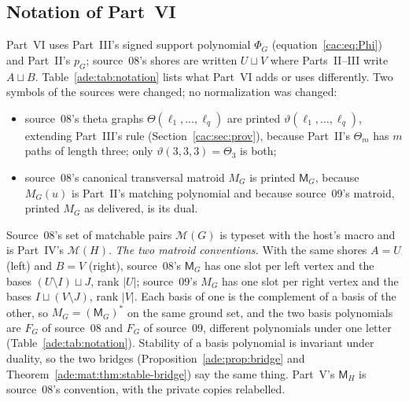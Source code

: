 \documentclass[11pt]{article}
\numberwithin{equation}{section}
\theoremstyle{definition}
\begin{document}
\subsection{Notation of Part~VI}
\label{ade:sec:notation}
Part~VI uses Part~III's signed support polynomial $\Phi_G$
(equation~\eqref{cac:eq:Phi}) and Part~II's $p_G$; source~08's shores are
written $U\sqcup V$ where Parts~II--III write $A\sqcup B$.
Table~\ref{ade:tab:notation} lists what Part~VI adds or uses differently.
Two symbols of the sources were changed; no normalization was changed:
\begin{itemize}[leftmargin=1.4em]
\item source~08's theta graphs $\Theta(\ell_1,\ldots,\ell_q)$ are printed
$\vartheta(\ell_1,\ldots,\ell_q)$, extending Part~III's rule
(Section~\ref{cac:sec:prov}), because Part~II's $\Theta_m$ has $m$ paths of
length three; only $\vartheta(3,3,3)=\Theta_3$ is both;
\item source~08's canonical transversal matroid $M_G$ is printed
$\mathsf M_G$, because $M_G(u)$ is Part~II's matching polynomial and because
source~09's matroid, printed $M_G$ as delivered, is its dual.
\end{itemize}
Source~08's set of matchable pairs $\mathcal M(G)$ is typeset with the
host's macro and is Part~IV's $\mathcal M(H)$.
\emph{The two matroid conventions.} With the same shores $A=U$ (left) and
$B=V$ (right), source~08's $\mathsf M_G$ has one slot per left vertex and the
bases $(U\setminus I)\sqcup J$, rank $|U|$; source~09's $M_G$ has one slot per
right vertex and the bases $I\sqcup(V\setminus J)$, rank $|V|$. Each basis of
one is the complement of a basis of the other, so $M_G=(\mathsf M_G)^*$ on the
same ground set, and the two basis polynomials are $F_G$ of source~08 and
$F_G$ of source~09, different polynomials under one letter
(Table~\ref{ade:tab:notation}). Stability of a basis polynomial is invariant
under duality, so the two bridges (Proposition~\ref{ade:prop:bridge} and
Theorem~\ref{ade:mat:thm:stable-bridge}) say the same thing. Part~V's
$\mathsf M_H$ is source~08's convention, with the private copies relabelled.
\end{document}
